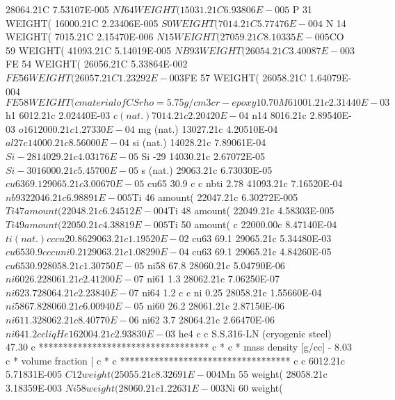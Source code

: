 \begin{python}
28064.21C 7.53107E-005 $NI 64 WEIGHT(%
15031.21C 6.93806E-005 $ P 31 WEIGHT(%
16000.21C 2.23406E-005 $ S  0 WEIGHT(%
7014.21C 5.77476E-004 $ N 14 WEIGHT(%
7015.21C 2.15470E-006 $ N 15 WEIGHT(%
27059.21C 8.10335E-005 $CO 59 WEIGHT(%
41093.21C 5.14019E-005 $NB 93 WEIGHT(%
26054.21C 3.40087E-003 $FE 54 WEIGHT(%
26056.21C 5.33864E-002 $FE 56 WEIGHT(%
26057.21C 1.23292E-003 $FE 57 WEIGHT(%
26058.21C 1.64079E-004 $FE 58 WEIGHT(%
c material of CS rho=5.75 g/cm3
c          r-epoxy      10.70%
M6   1001.21c 2.31440E-03  $ h1
6012.21c 2.02440E-03  $ c    (nat.)
7014.21c 2.20420E-04  $ n14
8016.21c 2.89540E-03  $ o16
12000.21c 1.27330E-04  $ mg   (nat.)
13027.21c 4.20510E-04  $ al27
c          14000.21c 8.56000E-04  $ si   (nat.)
14028.21c  7.89061E-04  $  Si -28
14029.21c  4.03176E-05  $  Si -29
14030.21c  2.67072E-05  $  Si -30
16000.21c 5.45700E-05  $ s    (nat.)
29063.21c 6.73030E-05  $ cu63   69.1%
29065.21c 3.00670E-05  $ cu65   30.9%
c
c         nbti       2.78%
41093.21c 7.16520E-04  $ nb93
22046.21c 6.98891E-005 $Ti 46 amount(%
22047.21c 6.30272E-005 $Ti 47 amount(%
22048.21c 6.24512E-004 $Ti 48 amount(%
22049.21c 4.58303E-005 $Ti 49 amount(%
22050.21c 4.38819E-005 $Ti 50 amount(%
c     22000.00c 8.47140E-04  $ ti   (nat.)
c
c           cu      20.86%
29063.21c 1.19520E-02  $ cu63   69.1%
29065.21c 5.34480E-03  $ cu65   30.9%
c
c             cuni       0.21%
29063.21c 1.08290E-04  $ cu63   69.1%
29065.21c 4.84260E-05  $ cu65   30.9%
28058.21c 1.30750E-05  $ ni58   67.8%
28060.21c 5.04790E-06  $ ni60   26.2%
28061.21c 2.41200E-07  $ ni61    1.3%
28062.21c 7.06250E-07  $ ni62    3.7%
28064.21c 2.23840E-07  $ ni64    1.2%
c
c            ni       0.25%
28058.21c 1.55660E-04  $ ni58   67.8%
28060.21c 6.00940E-05  $ ni60   26.2%
28061.21c 2.87150E-06  $ ni61    1.3%
28062.21c 8.40770E-06  $ ni62    3.7%
28064.21c 2.66470E-06  $ ni64    1.2%
c
c            liqHe         16%
2004.21c 2.93830E-03  $ he4
c
c      S.S.316-LN (cryogenic steel) 47.30%
c ***********************************
c *
c *  mass density [g/cc] - 8.03
c *  volume fraction [%
c *
c ***********************************
c
c
6012.21c 5.71831E-005 $ C 12 weight(%
25055.21c 8.32691E-004 $Mn 55 weight(%
28058.21c 3.18359E-003 $Ni 58 weight(%
28060.21c 1.22631E-003 $Ni 60 weight(%

\end{python}
